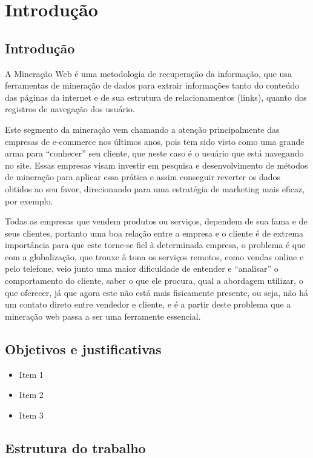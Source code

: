 \chapter{Introdução}

\section{Introdução}
    A Mineração Web é uma metodologia de recuperação da informação, que usa ferramentas de mineração de dados para extrair informações tanto do conteúdo das páginas da internet e de sua estrutura de relacionamentos (links), quanto dos registros de navegação dos usuário.

	Este segmento da mineração vem chamando a atenção principalmente das empresas de e-commerce nos últimos anos, pois tem sido visto como uma grande arma para “conhecer” seu cliente, que neste caso é o usuário que está navegando no site. Essas empresas visam investir em pesquisa e desenvolvimento de métodos de mineração para aplicar essa prática e assim conseguir reverter os dados obtidos ao seu favor, direcionando para uma estratégia de marketing mais eficaz, por exemplo.

	Todas as empresas que vendem produtos ou serviços, dependem de sua fama e de seus clientes, portanto uma boa relação entre a empresa e o cliente é de extrema importância para que este torne-se fiel à determinada empresa, o problema é que com a globalização, que trouxe à tona os serviços remotos, como vendas online e pelo telefone, veio junto uma maior dificuldade de entender e “analisar” o comportamento do cliente, saber o que ele procura, qual a abordagem utilizar, o que oferecer, já que agora este não está mais fisicamente presente, ou seja, não há um contato direto entre vendedor e cliente, e é a partir deste problema que a mineração web passa a ser uma ferramente essencial.

\section{Objetivos e justificativas}

\begin{itemize}
\item Item 1
\item Item 2
\item Item 3
\end{itemize}


\section{Estrutura do trabalho}

